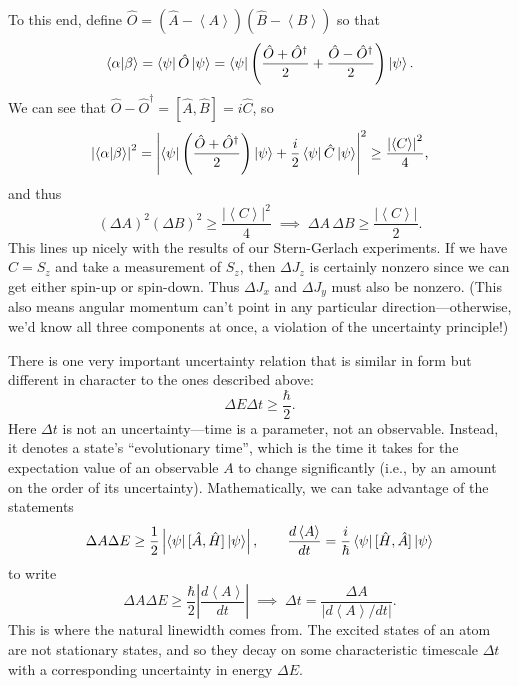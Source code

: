 \documentclass[../p116main.tex]{subfiles}
\begin{document}
To this end, define $\hat O = (\hat A - \left< A \right>)(\hat B - \left< B \right>)$ so that
\[ \left< \alpha \middle| \beta \right> = \left< \psi \right| \hat O \left| \psi \right> = \left< \psi \right| \left( \frac{\hat O + \hat O^\dagger}{2} + \frac{\hat O - \hat O^\dagger}{2} \right) \left| \psi \right>. \]
We can see that $\hat O - \hat O^\dagger = [\hat A, \hat B] = i \hat C$, so
\[ \left| \left< \alpha \middle| \beta \right> \right|^2 = \left| \left< \psi \right| \left( \frac{\hat O + \hat O^\dagger}{2} \right) \left| \psi \right> + \frac{i}{2} \left< \psi \right| \hat C \left| \psi \right> \right|^2 \geq \frac{\left| \left< C \right> \right|^2}{4}, \]
and thus
\[ (\Delta A)^2 (\Delta B)^2 \geq \frac{\left| \left< C \right> \right|^2}{4} \;\implies\; \Delta A \, \Delta B \geq \frac{\left| \left< C \right> \right|}{2}. \]
This lines up nicely with the results of our Stern-Gerlach experiments.
If we have $\hat C = S_z$ and take a measurement of $S_z$, then $\Delta J_z$ is certainly nonzero since we can get either spin-up or spin-down.
Thus $\Delta J_x$ and $\Delta J_y$ must also be nonzero.
(This also means angular momentum can't point in any particular direction---otherwise, we'd know all three components at once, a violation of the uncertainty principle!)

There is one very important uncertainty relation that is similar in form but different in character to the ones described above:
\[ \Delta E \Delta t \geq \frac{\hbar}{2}. \]
Here $\Delta t$ is not an uncertainty---time is a parameter, not an observable.
Instead, it denotes a state's ``evolutionary time'', which is the time it takes for the expectation value of an observable $A$ to change significantly (i.e., by an amount on the order of its uncertainty).
Mathematically, we can take advantage of the statements
\[ \Delta A \Delta E \geq \frac{1}{2} \left| \left< \psi \right| [\hat A, \hat H] \left| \psi \right> \right|, \qquad \frac{d \left< A \right>}{dt} = \frac{i}{\hbar} \left< \psi \right| [\hat H, \hat A] \left| \psi \right> \]
to write
\[ \Delta A \Delta E \geq \frac{\hbar}{2} \left| \frac{d \left< A \right>}{dt} \right| \;\implies\; \Delta t = \frac{\Delta A}{|d \left< A \right> / dt|}. \]
This is where the natural linewidth comes from.
The excited states of an atom are not stationary states, and so they decay on some characteristic timescale $\Delta t$ with a corresponding uncertainty in energy $\Delta E$.
\end{document}
